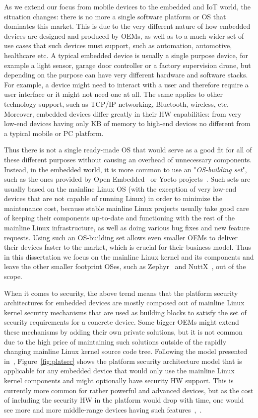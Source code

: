 As we extend our focus from mobile devices to the embedded and IoT world, the situation changes: there is no more a single software platform or OS that dominates this market. This is due to the very different nature of how embedded devices are designed and produced by OEMs, as well as to a much wider set of use cases that such devices must support, such as automation, automotive, healthcare etc. A typical embedded device is usually a single purpose device, for example a light sensor, garage door controller or a factory supervision drone, but depending on the purpose can have very different hardware and software stacks. For example, a device might need to interact with a user and therefore require a user interface or it might not need one at all. The same applies to other technology support, such as TCP/IP networking, Bluetooth, wireless, etc. Moreover, embedded devices differ greatly in their HW capabilities: from very low-end devices having only KB of memory to high-end devices no different from a typical mobile or PC platform.

Thus there is not a single ready-made OS that would serve as a good fit for all of these different purposes without causing an overhead of unnecessary components. Instead, in the embedded world, it is more common to use an "\textit{OS-building set}", such as the ones provided by Open Embedded~\cite{OE2017} or Yocto projects~\cite{yocto2017}. Such sets are usually based on the mainline Linux OS (with the exception of very low-end devices that are not capable of running Linux) in order to minimize the maintenance cost, because stable mainline Linux projects usually take good care of keeping their components up-to-date and functioning with the rest of the mainline Linux infrastructure, as well as doing various bug fixes and new feature requests. Using such an OS-building set allows even smaller OEMs to deliver their devices faster to the market, which is crucial for their business model. Thus in this dissertation we focus on the mainline Linux kernel and its components and leave the other smaller footprint OSes, such as Zephyr~\cite{zephyr} and NuttX~\cite{NuttX}, out of the scope. 

When it comes to security, the above trend means that the platform security architectures for embedded devices are mostly composed out of mainline Linux kernel security mechanisms that are used as building blocks to satisfy the set of security requirements for a concrete device. Some bigger OEMs might extend these mechanisms by adding their own private solutions, but it is not common due to the high price of maintaining such solutions outside of the rapidly changing mainline Linux kernel source code tree. Following the model presented in~\cite{2013Asokan}, Figure~\ref{fig:platsec} shows the platform security architecture model that is applicable for any embedded device that would only use the mainline Linux kernel components and might optionally have security HW support. This is currently more common for rather powerful and advanced devices, but as the cost of including the security HW in the platform would drop with time, one would see more and more middle-range devices having such features~\cite{marketresearch},~\cite{iothwsecurity}. 


